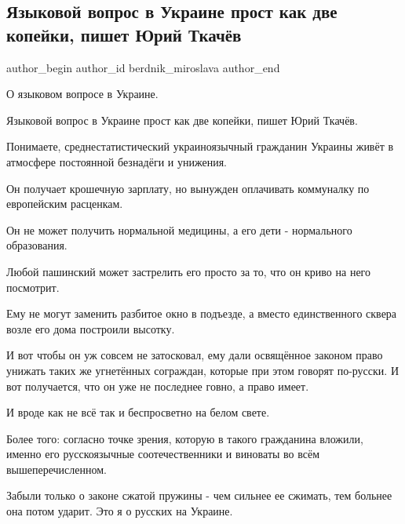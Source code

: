  
 
 
 
 
 
\subsection{Языковой вопрос в Украине прост как две копейки, пишет Юрий Ткачёв}
\label{sec:14_09_2021.fb.berdnik_miroslava.1.tkachev_jurij_jazykovoj_vopros}
 
\ifcmt
 author_begin
   author_id berdnik_miroslava
 author_end
\fi

О языковом вопросе в Украине.

Языковой вопрос в Украине прост как две копейки, пишет Юрий Ткачёв.

Понимаете, среднестатистический украиноязычный гражданин Украины живёт в
атмосфере постоянной безнадёги и унижения. 

Он получает крошечную зарплату, но вынужден оплачивать коммуналку по
европейским расценкам.

Он не может получить нормальной медицины, а его дети - нормального образования.

Любой пашинский может застрелить его просто за то, что он криво на него
посмотрит.

Ему не могут заменить разбитое окно в подъезде, а вместо единственного сквера
возле его дома построили высотку.

И вот чтобы он уж совсем не затосковал, ему дали освящённое законом право
унижать таких же угнетённых сограждан, которые при этом говорят по-русски. И
вот получается, что он уже не последнее говно, а право имеет.

И вроде как не всё так и беспросветно на белом свете.

\begin{itemize} %
Более того: согласно точке зрения, которую в такого гражданина вложили, именно его русскоязычные соотечественники и виноваты во всём вышеперечисленном.

Забыли только о законе сжатой пружины - чем сильнее ее сжимать, тем больнее она потом ударит. Это я о русских на Украине.
\end{itemize} %
